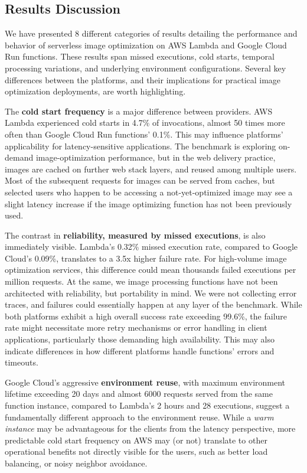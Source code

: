 \subsection{Results Discussion}
We have presented 8 different categories of results detailing the performance and behavior of serverless image optimization on AWS Lambda and Google Cloud Run functions. These results span missed executions, cold starts, temporal processing variations, and underlying environment configurations. Several key differences between the platforms, and their implications for practical image optimization deployments, are worth highlighting.

The \textbf{cold start frequency} is a major difference between providers. AWS Lambda experienced cold starts in 4.7\% of invocations, almost 50 times more often than Google Cloud Run functions' 0.1\%. This may influence platforms' applicability for latency-sensitive applications. The benchmark is exploring on-demand image-optimization performance, but in the web delivery practice, images are cached on further web stack layers, and reused among multiple users. Most of the subsequent requests for images can be served from caches, but selected users who happen to be accessing a not-yet-optimized image may see a slight latency increase if the image optimizing function has not been previously used.

The contrast in \textbf{reliability, measured by missed executions}, is also immediately visible. Lambda's 0.32\% missed execution rate, compared to Google Cloud's 0.09\%, translates to a 3.5x higher failure rate. For high-volume image optimization services, this difference could mean thousands failed executions per million requests. At the same, we image processing functions have not been architected with reliability, but portability in mind. We were not collecting error traces, and failures could essentially happen at any layer of the benchmark. While both platforms exhibit a high overall success rate exceeding 99.6\%, the failure rate might necessitate more retry mechanisms or error handling in client applications, particularly those demanding high availability. This may also indicate differences in how different platforms handle functions' errors and timeouts.

Google Cloud's aggressive \textbf{environment reuse}, with maximum environment lifetime exceeding 20 days and almost 6000 requests served from the same function instance, compared to Lambda's 2 hours and 28 executions, suggest a fundamentally different approach to the environment reuse. While a \emph{warm instance} may be advantageous for the clients from the latency perspective, more predictable cold start frequency on AWS may (or not) translate to other operational benefits not directly visible for the users, such as better load balancing, or noisy neighbor avoidance.

